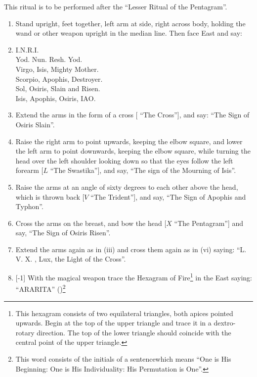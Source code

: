This ritual is to be performed after the \enquote{Lesser Ritual of the Pentagram}.
\begin{enumerate}[label=(\textit{\Roman*})]
\item Stand upright, feet together, left arm at side, right across body, holding the wand or other weapon upright in the median line. Then face East and say:
\item I.N.R.I. \\
Yod. Nun. Resh. Yod. \\
Virgo, Isis, Mighty Mother. \\
Scorpio, Apophis, Destroyer. \\
Sol, Osiris, Slain and Risen. \\
Isis, Apophis, Osiris, \textgreek{ΙΑΟ}.
\item Extend the arms in the form of a cross [\Cross \textendash{} \enquote{The Cross}], and say: \enquote{The Sign of Osiris Slain}.
\item Raise the right arm to point upwards, keeping the elbow square, and lower the left arm to point downwards, keeping the elbow square, while turning the head over the left shoulder looking down so that the eyes follow the left forearm [$L$ \textendash{} \enquote{The Swastika}], and say, \enquote{The sign of the Mourning of Isis}.
\item Raise the arms at an angle of sixty degrees to each other above the head, which is thrown back [$V$ \textendash{} \enquote{The Trident}], and say, \enquote{The Sign of Apophis and Typhon}.
\item Cross the arms on the breast, and bow the head [$X$ \textendash{} \enquote{The Pentagram}] and say, \enquote{The Sign of Osiris Risen}.
\item Extend the arms again as in (iii) and cross them again as in (vi) saying: \enquote{L.\nolinebreak{} V.\nolinebreak{} X.\nolinebreak{} , Lux, the Light of the Cross}.
\item {}[-1] With the magical weapon trace the Hexagram of Fire\footnote{This hexagram consists of two equilateral triangles, both apices pointed upwards. Begin at the top of the upper triangle and trace it in a dextro-rotary direction. The top of the lower triangle should coincide with the central point of the upper triangle.} in the East saying: \enquote{ARARITA} ()\footnote{This word consists of the initials of a sentence\footnotemark which means \enquote{One is His Beginning: One is His Individuality: His Permutation is One}.}

\end{enumerate}
